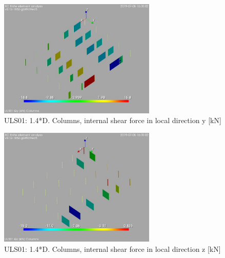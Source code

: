 \begin{figure}
\begin{center}
\includegraphics[width=75mm]{annex_res_columns/graphics/resSimplLC/ULS01columnsQy}
\caption{ULS01: 1.4*D. Columns, internal shear force in local direction y [kN]}
\end{center}
\end{figure}
\begin{figure}

\begin{center}
\includegraphics[width=75mm]{annex_res_columns/graphics/resSimplLC/ULS01columnsQz}
\caption{ULS01: 1.4*D. Columns, internal shear force in local direction z [kN]}
\end{center}
\end{figure}

